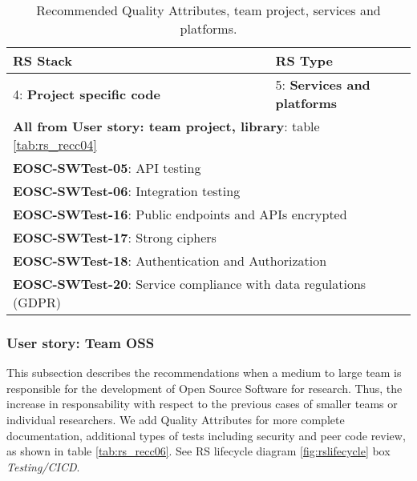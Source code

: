 \begin{center}
\begin{table}

  \label{tab:rs_recc05}
  \small
  \begin{tabular}{|p{0.65\linewidth}|p{0.35\linewidth}|} \hline

    \textbf{RS Stack} & \textbf{RS Type} \\ \hline \hline
    4: \textbf{Project specific code} &
    5: \textbf{Services and platforms} \\ \hline \hline
    \multicolumn{2}{|l|}{\textbf{All from User story: team project, library}: table \ref{tab:rs_recc04}} \\ \hline
    \multicolumn{2}{|l|}{\textbf{EOSC-SWTest-05}: API testing} \\ \hline
    \multicolumn{2}{|l|}{\textbf{EOSC-SWTest-06}: Integration testing} \\ \hline
    \multicolumn{2}{|l|}{\textbf{EOSC-SWTest-16}: Public endpoints and APIs encrypted} \\ \hline
    \multicolumn{2}{|l|}{\textbf{EOSC-SWTest-17}: Strong ciphers} \\ \hline
    \multicolumn{2}{|l|}{\textbf{EOSC-SWTest-18}: Authentication and Authorization} \\ \hline
    \multicolumn{2}{|l|}{\textbf{EOSC-SWTest-20}: Service compliance with data regulations (GDPR)} \\ \hline

  \end{tabular}
  \caption{Recommended Quality Attributes, team project, services and platforms.}
\end{table}
\end{center}

\subsubsection{User story: Team OSS}

This subsection describes the recommendations when a medium to large team is responsible for the development of Open Source Software for research. Thus, the increase in responsability with respect to the previous cases of smaller teams or individual researchers. We add Quality Attributes for more complete documentation, additional types of tests including security and peer code review, as shown in table \ref{tab:rs_recc06}. See RS lifecycle diagram \ref{fig:rslifecycle} box \textit{Testing/CICD}.

